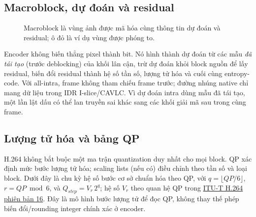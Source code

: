 \documentclass[11pt,a4paper]{article}
\renewcommand{\_}{\origunderscore\allowbreak}
\begin{document}
\subsection{Macroblock, dự đoán và residual}
\begin{figure}[H]\centering
{}
\caption{Macroblock là vùng ảnh được mã hóa cùng thông tin dự đoán và residual; ô đỏ là ví dụ vùng được phóng to.}
\label{fig:macroblock}
\end{figure}
Encoder không biến thẳng pixel thành bit. Nó hình thành dự đoán từ các mẫu \emph{đã tái tạo} (trước deblocking) của khối lân cận, trừ dự đoán khỏi block nguồn để lấy residual, biến đổi residual thành hệ số tần số, lượng tử hóa và cuối cùng entropy-code. Với all-intra, frame không tham chiếu frame trước; đường nhúng native chỉ mang dữ liệu trong IDR I-slice/CAVLC. Vì dự đoán intra dùng mẫu đã tái tạo, một lần lật dấu có thể lan truyền sai khác sang các khối giải mã sau trong cùng frame.

\subsection{Lượng tử hóa và bảng QP}
H.264 không bắt buộc một ma trận quantization duy nhất cho mọi block. QP xác định mức bước lượng tử hóa; scaling lists (nếu có) điều chỉnh theo tần số và loại block. Dưới đây là chu kỳ hệ số bước cơ sở chuẩn hóa theo QP, với $q=\lfloor QP/6\rfloor$, $r=QP\bmod 6$, và $Q_{step}=V_r\,2^q$; hệ số $V_r$ theo quan hệ QP trong \href{https://www.itu.int/dms_pubrec/itu-t/rec/h/T-REC-H.264-202606-I%21%21SUM-HTM-E.htm}{ITU-T H.264 phiên bản 16}. Đây là mô hình bước lượng tử để đọc QP, không thay thế phép biến đổi/rounding integer chính xác ở encoder.
\end{document}
